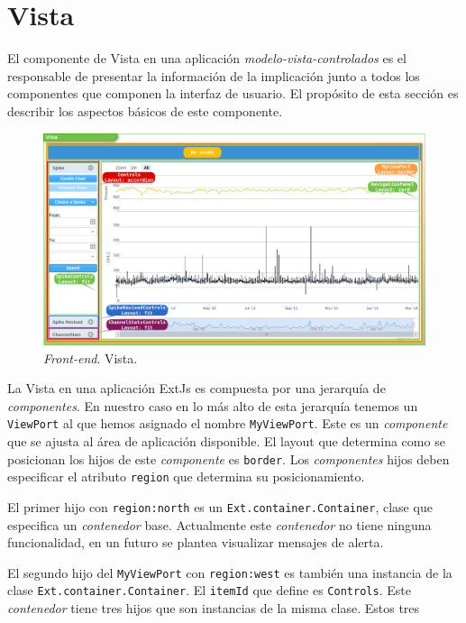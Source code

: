 \section{Vista}
	El componente de Vista en una aplicación \emph{modelo-vista-controlados}\cite{MVCWiki} es el responsable de presentar la información de la
	implicación junto a todos los componentes que componen la interfaz de usuario.  El propósito de esta sección es describir los aspectos básicos
	de este componente.
	\begin{figure}[h]
		\centering
		\includegraphics[keepaspectratio, width=1\textwidth]{./img/vista.png}
		\caption{\emph{Front-end}. Vista.}   
		\label{fig:vista}
	\end{figure}
	\par
	La Vista en una aplicación ExtJs es compuesta por una jerarquía de \emph{componentes}. En nuestro caso en lo más alto de esta jerarquía
	tenemos un \texttt{ViewPort} al que hemos asignado el nombre \texttt{MyViewPort}. Este es un \emph{componente} que se ajusta al área de
	aplicación disponible. El layout que determina como se posicionan los hijos de este \emph{componente} es \texttt{border}. Los
	\emph{componentes} hijos deben especificar el atributo \texttt{region} que determina su posicionamiento.
	\par
	El primer hijo con \texttt{region:north} es un \texttt{Ext.container.Container}, clase que especifica un \emph{contenedor} base. Actualmente este
	\emph{contenedor} no tiene ninguna funcionalidad, en un futuro se plantea visualizar mensajes de alerta.
	\par
	El segundo hijo del \texttt{MyViewPort} con \texttt{region:west} es también una instancia de la clase \texttt{Ext.container.Container}. El
	\texttt{itemId} que define es \texttt{Controls}. Este \emph{contenedor} tiene tres hijos que son instancias de la misma clase. Estos tres
